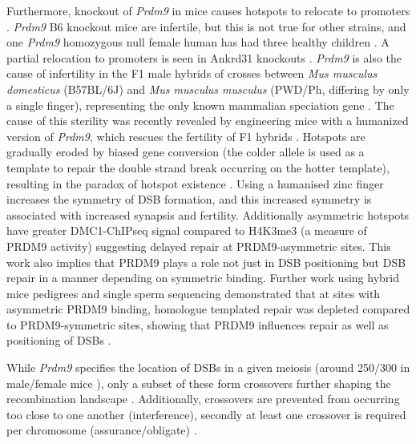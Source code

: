 Furthermore, knockout of \textit{Prdm9} in mice causes hotspots to relocate to promoters \parencite{Brick2012Genetic}.
\textit{Prdm9} B6 knockout mice are infertile, but this is not true for other strains, and one \textit{Prdm9} homozygous null female human has had three healthy children \parencite{Hayashi2005histone, Mihola2019Histone, Narasimhan2016Health}.
A partial relocation to promoters is seen in Ankrd31 knockouts \parencite{Boekhout2019REC114, Papanikos2018ANKRD31}.
\textit{Prdm9} is also the cause of infertility in the F1 male hybrids of crosses between \textit{Mus musculus domesticus} (B57BL/6J) and \textit{Mus musculus musculus} (PWD/Ph, differing by only a single finger), representing the only known mammalian speciation gene \parencite{Forejt1974Genetic, Mihola2009Mouse}.
The cause of this sterility was recently revealed by engineering mice with a humanized version of \textit{Prdm9}, which rescues the fertility of F1 hybrids \parencite{Davies2016Reengineering}.
Hotspots are gradually eroded by biased gene conversion (the colder allele is used as a template to repair the double strand break occurring on the hotter template), resulting in the paradox of hotspot existence \parencite{Boulton1997hotspot, Coop2007Live, Myers2010Drive, Baker2015PRDM9}.
Using a humanised zinc finger increases the symmetry of DSB formation, and this increased symmetry is associated with increased synapsis and fertility.
Additionally asymmetric hotspots have greater DMC1-ChIPseq signal compared to H4K3me3 (a measure of PRDM9 activity) suggesting delayed repair at PRDM9-asymmetric sites.
This work also implies that PRDM9 plays a role not just in DSB positioning but DSB repair in a manner depending on symmetric binding.
Further work using hybrid mice pedigrees and single sperm sequencing demonstrated that at sites with asymmetric PRDM9 binding, homologue templated repair was depleted compared to PRDM9-symmetric sites, showing that PRDM9 influences repair as well as positioning of DSBs \parencite{Li2019highresolution, Hinch2019Factors}.

While \textit{Prdm9} specifies the location of DSBs in a given meiosis (around 250/300 in male/female mice \parencite{Baudat2007Regulating}), only a subset of these form crossovers further shaping the recombination landscape \parencite{Youds2011choice}.
Additionally, crossovers are prevented from occurring too close to one another (interference), secondly at least one crossover is required per chromosome (assurance/obligate) \parencite{Fledel-Alon2009BroadScale, Hunter2015Meiotic, Otto2019Crossover}.



